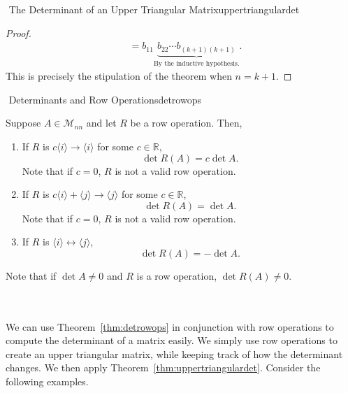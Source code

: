 \begin{theorem}{\Stop\,\,The Determinant of an Upper Triangular Matrix}{uppertriangulardet}
\begin{proof}
\begin{align*}
                    &= b_{11}\underbrace{b_{22}\cdots b_{(k+1)(k+1)}}_{\text{By the inductive hypothesis.}}.
                \end{align*}
                This is precisely the stipulation of the theorem when \(n=k+1\).
            \end{proof}

        \end{theorem}
        \pagebreak
        \begin{theorem}{\Stop\,\,Determinants and Row Operations}{detrowops}

            Suppose \(A\in\mathcal{M}_{nn}\) and let \(R\) be a row operation. Then,
            \begin{enumerate}
                \item If \(R\) is \(c\langle i\rangle\to\langle i \rangle\) for some \(c\in\mathbb{R}\), 
                \begin{equation*}
                    \det R(A) = c\det A.
                \end{equation*}
                Note that if \(c=0\), \(R\) is not a valid row operation.
                \item If \(R\) is \(c\langle i\rangle+\langle j \rangle\to\langle j \rangle\) for some \(c\in\mathbb{R}\),
                \begin{equation*}
                    \det R(A) = \det A.
                \end{equation*}
                Note that if \(c=0\), \(R\) is not a valid row operation.
                \item If \(R\) is \(\langle i \rangle\leftrightarrow\langle j \rangle\),
                \begin{equation*}
                    \det R(A) = -\det A.
                \end{equation*}
            \end{enumerate}
            Note that if \(\det A\neq 0\) and \(R\) is a row operation, \(\det R(A)\neq 0\).
        \end{theorem}
        \vphantom
        \\
        \\
        We can use Theorem~\ref{thm:detrowops} in conjunction with row operations to compute the determinant of a matrix easily. We simply use row operations to create an upper triangular matrix, while keeping track of how the determinant changes. We then apply Theorem~\ref{thm:uppertriangulardet}. Consider the following examples.
